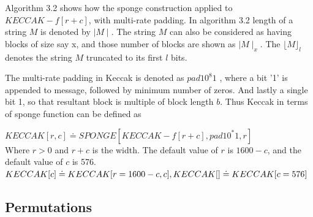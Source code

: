   Algorithm 3.2 shows how the sponge construction applied to $KECCAK-f[r + c]$, with multi-rate padding. In algorithm 3.2
  length of a string $M$ is denoted by $\mid M \mid $. The string $M$ can also be considered as having blocks of size say x,
  and those number of blocks are shown as $\mid M \mid_{x}$. The $\lfloor M \rfloor_{l}$ denotes the string $M$ truncated to its first $l$ bits.
  
  The multi-rate padding in Keccak is denoted as $pad 1 0^{8}1$ , where a bit '1' is appended to message, followed by minimum
  number of zeros. And lastly a single bit 1, so that resultant block is multiple of block length $b$. Thus Keccak in terms
  of sponge function can be defined as 

  $KECCAK[r, c] \doteq SPONGE[KECCAK-f[r + c], pad1 0^{*}1, r]$ \\
  Where $ r > 0$ and $r + c$ is the width. The default value of $r$ is $1600 - c$, and the default value of $c$ is 576. \\
  $KECCAK[c] \doteq KECCAK[r = 1600 - c, c], \\
  KECCAK[] \doteq KECCAK[c = 576]$
    
  \subsection{Permutations} \cite{00015}

